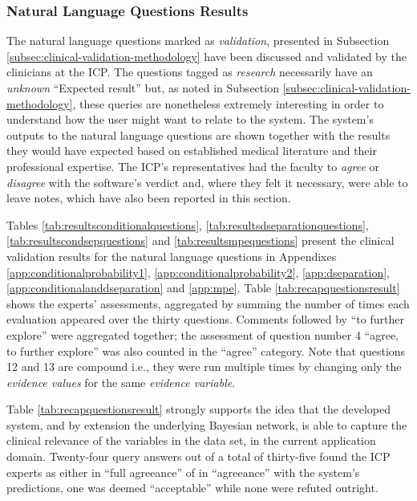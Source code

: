 \subsubsection{Natural Language Questions Results}
The natural language questions marked as \textit{validation}, presented in Subsection \ref{subsec:clinical-validation-methodology} have been discussed and validated by the clinicians at the ICP.
The questions tagged as \textit{research} necessarily have an \textit{unknown} \enquote{Expected result} but, as noted in Subsection \ref{subsec:clinical-validation-methodology}, these queries are nonetheless extremely interesting in order to understand how the user might want to relate to the system.
The system's outputs to the natural language questions are shown together with the results they would have expected based on established medical literature and their professional expertise.
The ICP's representatives had the faculty to \textit{agree} or \textit{disagree} with the software's verdict and, where they felt it necessary, were able to leave notes, which have also been reported in this section.

Tables \ref{tab:resultsconditionalquestions}, \ref{tab:resultsdseparationquestions}, \ref{tab:resultscondsepquestions} and \ref{tab:resultsmpequestions} present the clinical validation results for the natural language questions in Appendixes \ref{app:conditionalprobability1}, \ref{app:conditionalprobability2}, \ref{app:dseparation}, \ref{app:conditionalanddseparation} and \ref{app:mpe}. 
Table \ref{tab:recapquestionsresult} shows the experts' assessments, aggregated by summing the number of times each evaluation appeared over the thirty questions.
Comments followed by \enquote{to further explore} were aggregated together; the assessment of question number 4 \enquote{agree, to further explore} was also counted in the \enquote{agree} category.
Note that questions 12 and 13 are compound i.e., they were run multiple times by changing only the \textit{evidence values} for the same \textit{evidence variable}.

Table \ref{tab:recapquestionsresult} strongly supports the idea that the developed system, and by extension the underlying Bayesian network, is able to capture the clinical relevance of the variables in the data set, in the current application domain.
Twenty-four query answers out of a total of thirty-five found the ICP experts as either in \enquote{full agreeance} of in \enquote{agreeance} with the system's predictions, one was deemed \enquote{acceptable} while none were refuted outright.


